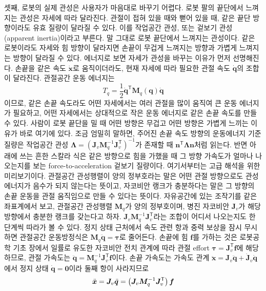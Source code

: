 셋째, 로봇의 실제 관성은 사용자가 마음대로 바꾸기 어렵다.
로봇 팔의 끝단에서 느껴지는 관성은 자세에 따라 달라진다.
관절이 접혀 있을 때와 뻗어 있을 때, 같은 끝단 방향이라도 유효 질량이 달라질 수 있다.
이를 작업공간 관성, 또는 겉보기 관성(apparent inertia)이라고 부른다.
말 그대로 로봇 끝단에서 느껴지는 관성이다.
같은 로봇이라도 자세와 힘 방향이 달라지면 손끝이 무겁게 느껴지는 방향과 가볍게 느껴지는 방향이 달라질 수 있다.
에너지로 보면 자세가 관성을 바꾸는 이유가 먼저 선명해진다.
손끝을 같은 속도 $\dot{\bm{x}}$로 움직이더라도, 현재 자세에 따라 필요한 관절 속도 $\dot{\bm{q}}$의 조합이 달라진다.
관절공간 운동 에너지는
\begin{equation}
  T_q=\frac{1}{2}\dot{\bm{q}}^{\mathsf{T}}\bm{M}_q(\bm{q})\dot{\bm{q}}
\end{equation}
이므로, 같은 손끝 속도라도 어떤 자세에서는 여러 관절을 많이 움직여 큰 운동 에너지가 필요하고, 어떤 자세에서는 상대적으로 작은 운동 에너지로 같은 손끝 속도를 만들 수 있다.
사람이 로봇 끝단을 밀 때 어떤 방향은 무겁고 어떤 방향은 가볍게 느끼는 이유가 바로 여기에 있다.
조금 엄밀히 말하면, 주어진 손끝 속도 방향의 운동에너지 기준 질량은 작업공간 관성 $\bm{\Lambda}=(\bm{J}_v\bm{M}_q^{-1}\bm{J}_v^{\mathsf{T}})^{-1}$가 존재할 때 $\bm{n}^{\mathsf{T}}\bm{\Lambda}\bm{n}$처럼 읽는다.
반면 아래에 쓰는 흔한 스칼라 식은 같은 방향으로 힘을 가했을 때 그 방향 가속도가 얼마나 나오는지를 보는 force-to-acceleration 겉보기 질량이다.
여기서부터는 고급 해석을 위한 미리보기이다.
관절공간 관성행렬이 양의 정부호라는 말은 어떤 관절 방향으로도 관성 에너지가 음수가 되지 않는다는 뜻이고, 자코비안 랭크가 충분하다는 말은 그 방향의 손끝 운동을 관절 움직임으로 만들 수 있다는 뜻이다.
자유공간에 있는 조작기를 같은 좌표계에서 보고, 관절공간 관성행렬 $\bm{M}_q$가 양의 정부호이며, 병진 자코비안 $\bm{J}_v$가 해당 방향에서 충분한 랭크를 갖는다고 하자.
$\bm{J}_v\bm{M}_q^{-1}\bm{J}_v^{\mathsf{T}}$라는 조합이 어디서 나오는지도 한 단계씩 따라가 볼 수 있다.
정지 상태 근처에서 속도 관련 항과 중력 보상을 잠시 무시하면 관절공간 운동방정식은 $\bm{M}_q\ddot{\bm{q}}=\bm{\tau}$로 줄어든다.
손끝에 힘 $\bm{f}$를 가하는 것은 로봇공학 기초 장에서 일률로 유도한 자코비안 전치 관계에 따라 관절 effort $\bm{\tau}=\bm{J}_v^{\mathsf{T}}\bm{f}$에 해당하므로, 관절 가속도는 $\ddot{\bm{q}}=\bm{M}_q^{-1}\bm{J}_v^{\mathsf{T}}\bm{f}$이다.
손끝 가속도는 가속도 관계 $\ddot{\bm{x}}=\bm{J}_v\ddot{\bm{q}}+\dot{\bm{J}}_v\dot{\bm{q}}$에서 정지 상태 $\dot{\bm{q}}=\bm{0}$이라 둘째 항이 사라지므로
\[
  \ddot{\bm{x}}
  =
  \bm{J}_v\ddot{\bm{q}}
  =
  \left(\bm{J}_v\bm{M}_q^{-1}\bm{J}_v^{\mathsf{T}}\right)\bm{f}
\vmark{lambda-force-to-acceleration-derivation}%
\]
